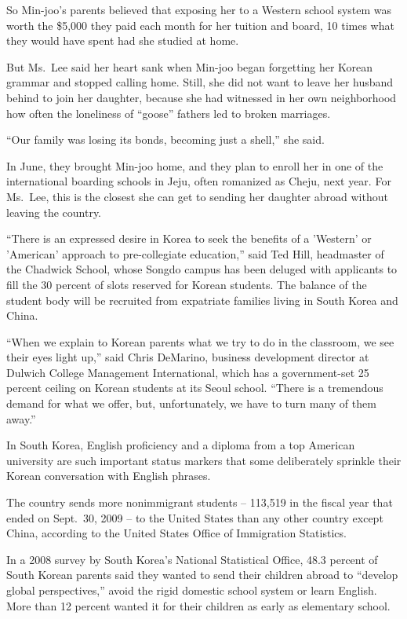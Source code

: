 ﻿\documentclass[12pt]{article}
\begin{document}
So Min-joo's parents believed that exposing her to a Western school system was worth the \$5,000
they paid each month for her tuition and board, 10 times what they would have spent had she studied
at home.

But Ms.~Lee said her heart sank when Min-joo began forgetting her Korean grammar and stopped calling
home. Still, she did not want to leave her husband behind to join her daughter, because she had
witnessed in her own neighborhood how often the loneliness of ``goose'' fathers led to broken
marriages.

``Our family was losing its bonds, becoming just a shell,'' she said.

In June, they brought Min-joo home, and they plan to enroll her in one of the international boarding
schools in Jeju, often romanized as Cheju, next year. For Ms.~Lee, this is the closest she can get
to sending her daughter abroad without leaving the country.

``There is an expressed desire in Korea to seek the benefits of a 'Western' or 'American' approach
to pre-collegiate education,'' said Ted Hill, headmaster of the Chadwick School, whose Songdo campus
has been deluged with applicants to fill the 30 percent of slots reserved for Korean students. The
balance of the student body will be recruited from expatriate families living in South Korea and
China.

``When we explain to Korean parents what we try to do in the classroom, we see their eyes light
up,'' said Chris DeMarino, business development director at Dulwich College Management
International, which has a government-set 25 percent ceiling on Korean students at its Seoul school.
``There is a tremendous demand for what we offer, but, unfortunately, we have to turn many of them
away.''

In South Korea, English proficiency and a diploma from a top American university are such important
status markers that some deliberately sprinkle their Korean conversation with English phrases.

The country sends more nonimmigrant students -- 113,519 in the fiscal year that ended on Sept.~30,
2009 -- to the United States than any other country except China, according to the United States
Office of Immigration Statistics.

In a 2008 survey by South Korea's National Statistical Office, 48.3 percent of South Korean parents
said they wanted to send their children abroad to ``develop global perspectives,'' avoid the rigid
domestic school system or learn English. More than 12 percent wanted it for their children as early
as elementary school.
\end{document}
